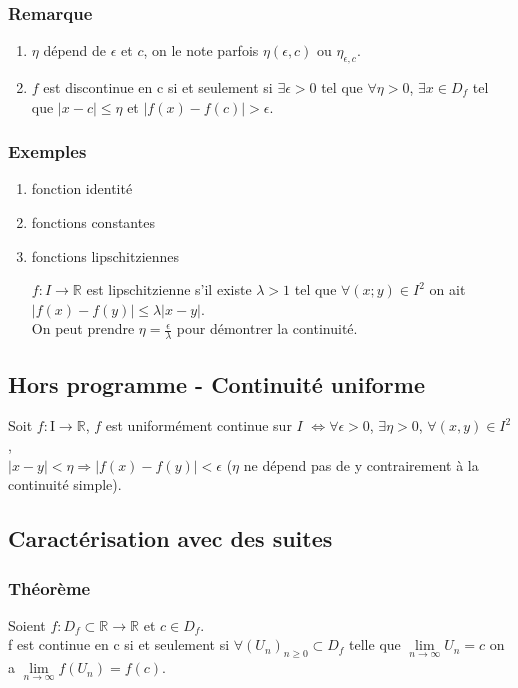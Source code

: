 \documentclass[a4paper,10pt]{book} %
\newcommand{\R}{\mathbb{R}}
\begin{document}
\subsubsection{Remarque} \begin{enumerate}
\item $\eta$ dépend de $\epsilon$ et $c$, on le note parfois $\eta(\epsilon,c)$ ou $\eta_{\epsilon,c}$.
\item $f$ est discontinue en c si et seulement si $\exists \epsilon>0$ tel que $\forall \eta>0$, $\exists x\in D_{f}$ tel que $|x-c|\leq \eta$ et $|f(x)-f(c)|>\epsilon$. \end{enumerate}

\subsubsection{Exemples}
\begin{enumerate}
\item fonction identité\\

\item fonctions constantes\\

\item fonctions lipschitziennes

$f:I\rightarrow \R$ est lipschitzienne s'il existe $\lambda>1$ tel que $\forall(x;y)\in I^{2}$ on ait $|f(x)-f(y)|\leq\lambda|x-y|$.\\
On peut prendre $\eta=\frac{\epsilon}{\lambda}$ pour démontrer la continuité. \end{enumerate}

\subsection{Hors programme - Continuité uniforme}
Soit $f : $I$ \rightarrow \R$, $f$ est uniformément continue sur $I$ $\Leftrightarrow \forall \epsilon>0$, $\exists \eta>0$, $\forall (x,y)\in I^{2}$,\\
$|x-y|<\eta \Rightarrow |f(x)-f(y)|<\epsilon$ ($\eta$ ne dépend pas de y contrairement à la continuité simple).

\subsection{Caractérisation avec des suites}
\subsubsection{Théorème}
Soient $f : D_{f}\subset\R \rightarrow \R$ et $c\in D_{f}$.\\
f est continue en c si et seulement si $\forall (U_{n})_{n\geq 0}\subset D_{f}$ telle que $\lim\limits_{n\rightarrow \infty}U_{n}=c$ on a $\lim\limits_{n\rightarrow \infty} f(U_{n})=f(c)$.
\end{document}
